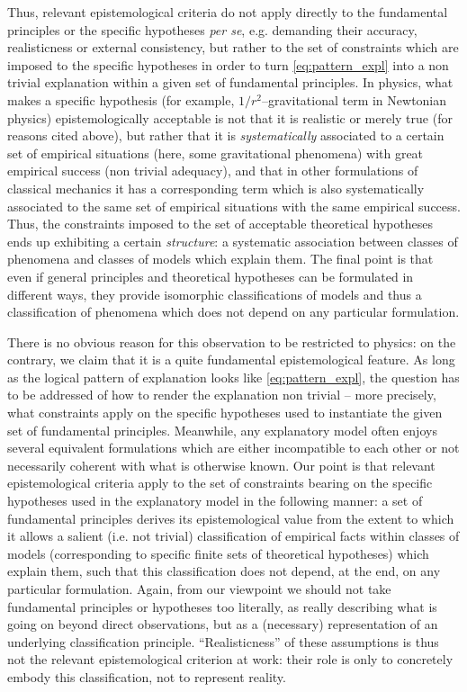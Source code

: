 \documentclass[a4paper,11pt]{article}
\theoremstyle{definition}
\begin{document}
{Thus, relevant epistemological criteria do not apply directly to the fundamental principles or the specific hypotheses \textit{per se}, e.g. demanding their accuracy, realisticness or external consistency, but rather to the set of constraints which are imposed to the specific hypotheses in order to turn \eqref{eq:pattern_expl} into a non trivial explanation within a given set of fundamental principles. In physics, what makes a specific hypothesis (for example, $1/r^2$--gravitational term in Newtonian physics) epistemologically acceptable is not that it is realistic or merely true (for reasons cited above), but rather that it is \textit{systematically} associated to a certain set of empirical situations (here, some gravitational phenomena) with great empirical success (non trivial adequacy), and that in other formulations of classical mechanics it has a corresponding term which is also systematically associated to the same set of empirical situations with the same empirical success. Thus, the constraints imposed to the set of acceptable theoretical hypotheses ends up exhibiting a certain \textit{structure}: a systematic association between classes of phenomena and classes of models which explain them. The final point is that even if general principles and theoretical hypotheses can be formulated in different ways, they provide isomorphic classifications of models and thus a classification of phenomena which does not depend on any particular formulation. 

There is no obvious reason for this observation to be restricted to physics: on the contrary, we claim that it is a quite fundamental epistemological feature. As long as the logical pattern of explanation looks like \eqref{eq:pattern_expl}, the question has to be addressed of how to render the explanation non trivial -- more precisely, what constraints apply on the specific hypotheses used to instantiate the given set of fundamental principles. Meanwhile, any explanatory model often enjoys several equivalent formulations which are either incompatible to each other or not necessarily coherent with what is otherwise known. Our point is that relevant epistemological criteria apply to the set of constraints bearing on the specific hypotheses used in the explanatory model in the following manner: a set of fundamental principles derives its epistemological value from the extent to which it allows a salient (i.e. not trivial) classification of empirical facts within classes of models (corresponding to specific finite sets of theoretical hypotheses) which explain them, such that this classification does not depend, at the end, on any particular formulation. Again, from our viewpoint we should not take fundamental principles or hypotheses too literally, as really describing what is going on beyond direct observations, but as a (necessary) representation of an underlying classification principle. ``Realisticness'' of these assumptions is thus not the relevant epistemological criterion at work: their role is only to concretely embody this classification, not to represent reality. 

}
\end{document}
